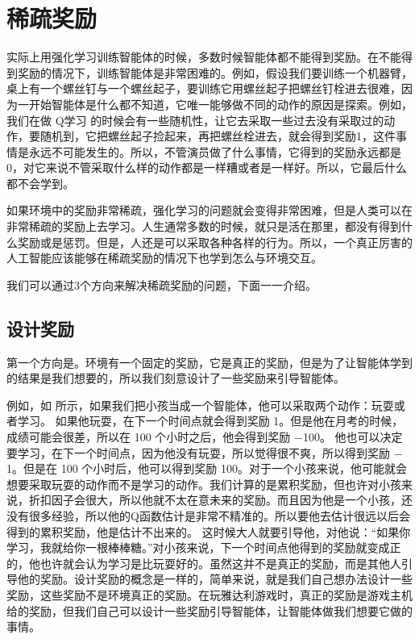 \section{稀疏奖励}
实际上用强化学习训练智能体的时候，多数时候智能体都不能得到奖励。在不能得到奖励的情况下，训练智能体是非常困难的。例如，假设我们要训练一个机器臂，桌上有一个螺丝钉与一个螺丝起子，要训练它用螺丝起子把螺丝钉栓进去很难，因为一开始智能体是什么都不知道，它唯一能够做不同的动作的原因是探索。例如，我们在做 Q学习 的时候会有一些随机性，让它去采取一些过去没有采取过的动作，要随机到，它把螺丝起子捡起来，再把螺丝栓进去，就会得到奖励1，这件事情是永远不可能发生的。所以，不管演员做了什么事情，它得到的奖励永远都是 0，对它来说不管采取什么样的动作都是一样糟或者是一样好。所以，它最后什么都不会学到。

如果环境中的奖励非常稀疏，强化学习的问题就会变得非常困难，但是人类可以在非常稀疏的奖励上去学习。人生通常多数的时候，就只是活在那里，都没有得到什么奖励或是惩罚。但是，人还是可以采取各种各样的行为。所以，一个真正厉害的人工智能应该能够在稀疏奖励的情况下也学到怎么与环境交互。

我们可以通过3个方向来解决稀疏奖励的问题，下面一一介绍。

\subsection{设计奖励}

第一个方向是。环境有一个固定的奖励，它是真正的奖励，但是为了让智能体学到的结果是我们想要的，所以我们刻意设计了一些奖励来引导智能体。

例如，如 所示，如果我们把小孩当成一个智能体，他可以采取两个动作：玩耍或者学习。
如果他玩耍，在下一个时间点就会得到奖励 1。但是他在月考的时候，成绩可能会很差，所以在 100 个小时之后，他会得到奖励 $-$100。
他也可以决定要学习，在下一个时间点，因为他没有玩耍，所以觉得很不爽，所以得到奖励 $-$1。但是在 100 个小时后，他可以得到奖励 100。对于一个小孩来说，他可能就会想要采取玩耍的动作而不是学习的动作。我们计算的是累积奖励，但也许对小孩来说，折扣因子会很大，所以他就不太在意未来的奖励。而且因为他是一个小孩，还没有很多经验，所以他的Q函数估计是非常不精准的。所以要他去估计很远以后会得到的累积奖励，他是估计不出来的。
这时候大人就要引导他，对他说：“如果你学习，我就给你一根棒棒糖。”对小孩来说，下一个时间点他得到的奖励就变成正的，他也许就会认为学习是比玩耍好的。虽然这并不是真正的奖励，而是其他人引导他的奖励。设计奖励的概念是一样的，简单来说，就是我们自己想办法设计一些奖励，这些奖励不是环境真正的奖励。在玩雅达利游戏时，真正的奖励是游戏主机给的奖励，但我们自己可以设计一些奖励引导智能体，让智能体做我们想要它做的事情。

